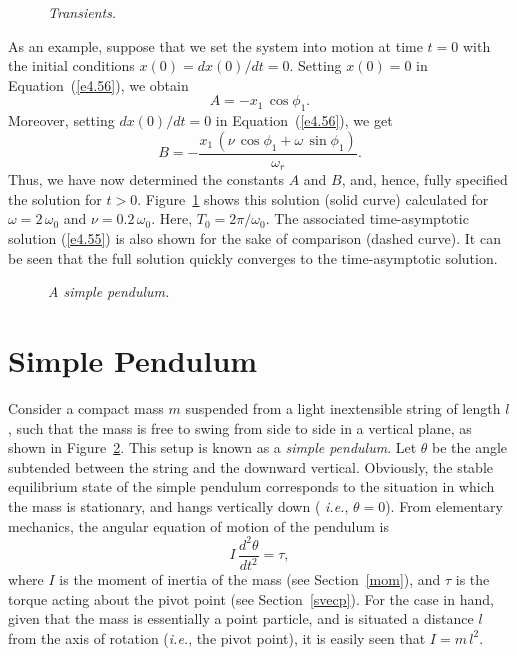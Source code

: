 \begin{figure}
\epsfysize=2.5in
\centerline{}
\caption{\em Transients.}\label{ftrans}   
\end{figure}

As an example, suppose that we set the system into motion at time
$t=0$ with the initial conditions $x(0)=dx(0)/dt=0$. 
Setting $x(0)=0$ in Equation~(\ref{e4.56}), we obtain
\begin{equation}
A = - x_1\,\cos\phi_1.
\end{equation}
Moreover, setting $dx(0)/dt=0$ in Equation~(\ref{e4.56}), we get
\begin{equation}
B = -\frac{x_1\,(\nu\,\cos\phi_1+\omega\,\sin\phi_1)}{\omega_r}.
\end{equation}
Thus, we have now determined the constants $A$ and $B$, and, hence,
fully specified the solution for $t>0$. Figure~\ref{ftrans}
shows  this solution (solid curve) calculated for
$\omega = 2\,\omega_0$ and 
$\nu=0.2\,\omega_0$. Here,  $T_0=2\pi/\omega_0$. The associated  time-asymptotic solution (\ref{e4.55})
is also shown for the sake of comparison (dashed curve). It can
be seen that the full solution quickly converges to the time-asymptotic
solution.

\begin{figure}
\epsfysize=2.5in
\centerline{}
\caption{\em A simple pendulum.}\label{f98}  
\end{figure}
\section{Simple Pendulum}\label{s4.8}
Consider a compact mass $m$ suspended from a light inextensible string of length $l$, such that the
mass is free to swing from side to side in a vertical plane, as shown in 
Figure~\ref{f98}.
This setup is known as a {\em simple pendulum}. 
 Let $\theta$ be the angle subtended between the string and
the downward vertical. Obviously, the stable equilibrium state of the simple pendulum corresponds to
the situation in which the mass is stationary, and hangs vertically down ({\em 
i.e.}, $\theta=0$).
From elementary mechanics, the angular equation of motion of the pendulum is 
\begin{equation}
I\,\frac{d^2{\theta}}{dt^2} = \tau,
\end{equation}
where $I$ is the moment of inertia of the mass (see Section~\ref{mom}), and $\tau$ is the torque acting 
about the pivot point (see Section~\ref{svecp}).
For the
case in hand, given that the mass is essentially a point particle, and is situated a distance $l$ from
the axis of rotation ({\em i.e.}, the pivot point), it is easily seen that 
$I=m\,l^2$. 

